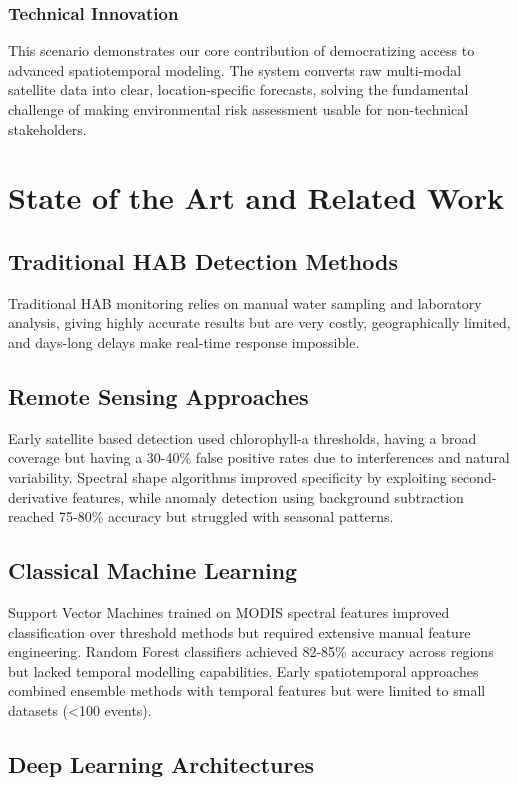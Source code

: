 \documentclass[conference]{IEEEtran}
\begin{document}
\subsubsection{Technical Innovation}
This scenario demonstrates our core contribution of democratizing access to advanced spatiotemporal modeling. The system converts raw multi-modal satellite data into clear, location-specific forecasts, solving the fundamental challenge of making environmental risk assessment usable for non-technical stakeholders.

\section{State of the Art and Related Work}


\subsection{Traditional HAB Detection Methods}
Traditional HAB monitoring relies on manual water sampling and laboratory analysis, giving highly accurate results but are very costly, geographically limited, and days-long delays make real-time response impossible.

\subsection{Remote Sensing Approaches}
Early satellite based detection used chlorophyll-a thresholds, having a broad coverage but having a 30-40\% false positive rates due to interferences and natural variability. Spectral shape algorithms improved specificity by exploiting second-derivative features, while anomaly detection using background subtraction reached 75-80\% accuracy but struggled with seasonal patterns.

\subsection{Classical Machine Learning}
Support Vector Machines trained on MODIS spectral features improved classification over threshold methods but required extensive manual feature engineering. Random Forest classifiers achieved 82-85\% accuracy across regions but lacked temporal modelling capabilities. Early spatiotemporal approaches combined ensemble methods with temporal features but were limited to small datasets (<100 events).

\subsection{Deep Learning Architectures}
\end{document}

